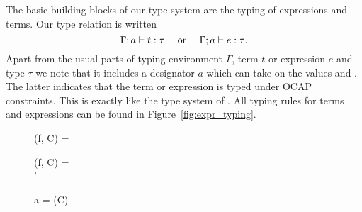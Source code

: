 The basic building blocks of our type system are the typing of expressions and
terms. Our type relation is written
\begin{equation}
  \mbox{$\Gamma;a\vdash t:\tau$} \quad \text{ or } \quad
  \mbox{$\Gamma;a\vdash e:\tau$}. \notag
\end{equation}
Apart from the usual parts of typing environment $\Gamma$, term $t$ or
expression $e$ and type $\tau$ we note that it includes a designator $a$ which
can take on the values \nocap{} and \ocap{}. The latter indicates that the term
or expression is typed under OCAP constraints. This is exactly like the type
system of \LaCasa{}. All typing rules for terms and expressions can be found in
Figure~\ref{fig:expr_typing}.

\begin{figure}[h!]
  \centering
    { \andalso {}}
    {}

    \vspace{0.5em}


    \vspace{0.5em}

    
    \vspace{0.5em}


    \vspace{0.5em}

    { \andalso \ftype(f, C) = \tau }
    {}
    
    \vspace{0.5em}

    { \andalso \ftype(f, C) = \tau \\
     \andalso \tau' \stof \tau }
    {}

    \vspace{0.5em}

    {a = \ocap \Longrightarrow \ocap(C)}
    {}


\end{figure}
